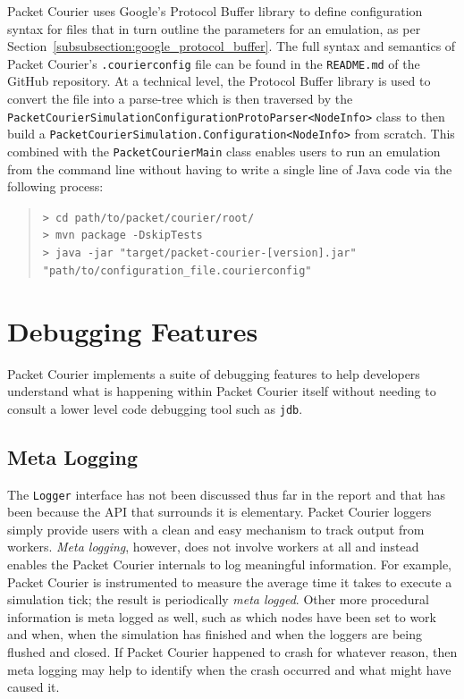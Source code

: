 Packet Courier uses Google's Protocol Buffer library\cite{google_protobuf} to define configuration syntax for files
that in turn outline the parameters for an emulation, as per Section~\ref{subsubsection:google_protocol_buffer}. The
full syntax and semantics of Packet Courier's \texttt{.courierconfig} file can be found in the \texttt{README.md} of
the GitHub repository\cite{packet_courier}. At a technical level, the Protocol Buffer library is used to convert the
file into a parse-tree which is then traversed by the
\texttt{PacketCourierSimulationConfigurationProtoParser<NodeInfo>} class to then build a
\texttt{PacketCourierSimulation.Configuration<NodeInfo>} from scratch. This combined with the
\texttt{PacketCourierMain} class enables users to run an emulation from the command line without having to write a
single line of Java code via the following process:
\begin{quote}
    \texttt{> cd path/to/packet/courier/root/} \\
    \texttt{> mvn package -DskipTests} \\
    \texttt{> java -jar "target/packet-courier-[version].jar"} \\ \texttt{"path/to/configuration\_file.courierconfig"}
\end{quote}


\section{Debugging Features}\label{section:debugging_features}

Packet Courier implements a suite of debugging features to help developers understand what is happening within Packet
Courier itself without needing to consult a lower level code debugging tool such as \texttt{jdb}\cite{jdb}.

\subsection{Meta Logging}\label{subsection:meta_logging}

The \texttt{Logger} interface has not been discussed thus far in the report and that has been because the API that
surrounds it is elementary. Packet Courier loggers simply provide users with a clean and easy mechanism to track
output from workers. \emph{Meta logging}, however, does not involve workers at all and instead enables the Packet
Courier internals to log meaningful information. For example, Packet Courier is instrumented to measure the average
time it takes to execute a simulation tick; the result is periodically \emph{meta logged}. Other more procedural
information is meta logged as well, such as which nodes have been set to work and when, when the simulation has
finished and when the loggers are being flushed and closed. If Packet Courier happened to crash for whatever reason,
then meta logging may help to identify when the crash occurred and what might have caused it.

